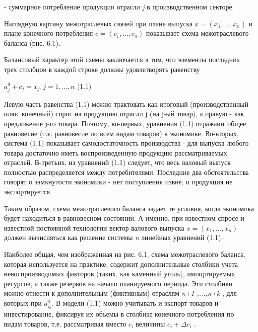 \documentclass[12pt, 4paper]{book}
\begin{document}
{- суммарное потребление продукции отрасли \textit{j} в производственном секторе.
\par

Наглядную картину межотраслевых связей при плане выпуска $x = (x_1,...,x_n)$ и плане конечного потребления $c=(c_1,...,c_n)$ показывает схема межотраслевого баланса (рис. 6.1).
\par

Балансовый характер этой схемы заключается в том, что элементы последних трех столбцов в каждой строке должны удовлетворять равенству 
\begin{center}
$a_{j}^{0}+c_j=x_j,j=1,...,n$ (1.1)
\end{center}
\par

Левую часть равенства (1.1) можно трактовать как итоговый (производственный плюс конечный) спрос на продукцию отрасли j (на j-ый товар), а правую - как предложение j-го товара. Поэтому, во-первых, уравнения (1.1) отражают общее равновесие (т.е. равновесие по всем видам товаров) в экономике. Во-вторых, система (1.1) показывает самодостаточность производства - для выпуска любого товара достаточно иметь воспроизведенную продукцию рассматриваемых отраслей. В-третьих, из уравнений (1.1) следует, что весь валовый выпуск полностью распределяется между потребителями. Последние два обстоятельства говорят о замкнутости экономики - нет поступления извне, и продукция не экспортируется.
\par

Таким образом, схема межотраслевого баланса задает те условия, когда экономика будет находиться в равновесном состоянии. А именно, при известном спросе и известной постоянной технологии вектор валового выпуска $x=(x_1,...,x_n)$ должен вычисляться как решение системы \textit{n} линейных уравнений (1.1).
\par

Наиболее общая, чем изображенная на рис. 6.1, схема межотраслевого баланса, которая используется на практике, содержит дополнительные столбики учета невоспроизводимых факторов (таких, как каменный уголь), импортируемых ресурсов, а также резервов на начало планируемого периода. Эти столбики можно отнести к дополнительным (фиктивным) отраслям \textit{n+1 ,...,n+k} , для которых  при $a_{ij}^0$. В модели (1.1) можно учитывать и экспорт товаров и инвестирование, фиксируя их объемы в столбике конечного потребления по видам товаров, т.е. рассматривая вместо $c_i$ величины $c_i+\Delta c_i$ .
\par

}
\end{document}
